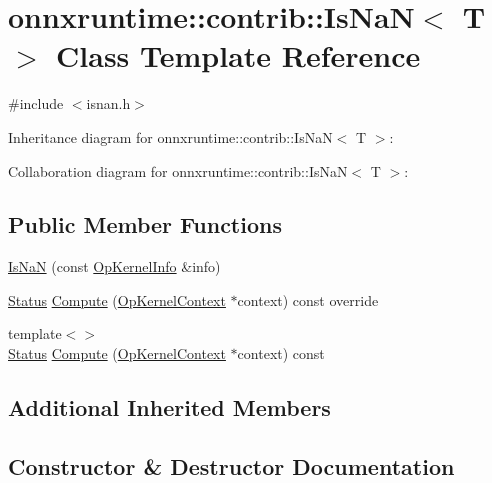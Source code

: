 \hypertarget{classonnxruntime_1_1contrib_1_1IsNaN}{}\section{onnxruntime\+:\+:contrib\+:\+:Is\+NaN$<$ T $>$ Class Template Reference}
\label{classonnxruntime_1_1contrib_1_1IsNaN}


{\ttfamily \#include $<$isnan.\+h$>$}



Inheritance diagram for onnxruntime\+:\+:contrib\+:\+:Is\+NaN$<$ T $>$\+:


Collaboration diagram for onnxruntime\+:\+:contrib\+:\+:Is\+NaN$<$ T $>$\+:
\subsection*{Public Member Functions}
\begin{DoxyCompactItemize}
\item 
\mbox{\hyperlink{classonnxruntime_1_1contrib_1_1IsNaN_ab562bf11b6a24f6dcd7afe38430cf398}{Is\+NaN}} (const \mbox{\hyperlink{classonnxruntime_1_1OpKernelInfo}{Op\+Kernel\+Info}} \&info)
\item 
\mbox{\hyperlink{classonnxruntime_1_1common_1_1Status}{Status}} \mbox{\hyperlink{classonnxruntime_1_1contrib_1_1IsNaN_a0530ca099b975b2d8927060982428610}{Compute}} (\mbox{\hyperlink{classonnxruntime_1_1OpKernelContext}{Op\+Kernel\+Context}} $\ast$context) const override
\item 
{\footnotesize template$<$$>$ }\\\mbox{\hyperlink{classonnxruntime_1_1common_1_1Status}{Status}} \mbox{\hyperlink{classonnxruntime_1_1contrib_1_1IsNaN_ad1f71b256793e672c6f9da4de46b0dbf}{Compute}} (\mbox{\hyperlink{classonnxruntime_1_1OpKernelContext}{Op\+Kernel\+Context}} $\ast$context) const
\end{DoxyCompactItemize}
\subsection*{Additional Inherited Members}


\subsection{Constructor \& Destructor Documentation}
\mbox{\label{classonnxruntime_1_1contrib_1_1IsNaN_ab562bf11b6a24f6dcd7afe38430cf398}} 
